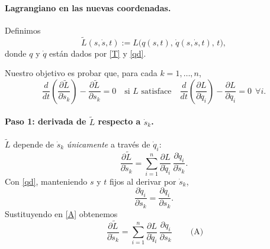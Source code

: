 \paragraph{Lagrangiano en las nuevas coordenadas.}
Definimos
\begin{equation}
\label{Ltilde}
\tilde L(s,\dot s,t):=L\!\big(q(s,t),\,\dot q(s,\dot s,t),\,t\big),
\end{equation}
donde $q$ y $\dot q$ están dados por \eqref{T} y \eqref{qd}.

Nuestro objetivo es probar que, para cada $k=1,\ldots,n$,
\[
\frac{d}{dt}\!\left(\frac{\partial \tilde L}{\partial \dot s_k}\right)
-\frac{\partial \tilde L}{\partial s_k}=0
\quad \text{si $L$ satisface}\quad
\frac{d}{dt}\!\left(\frac{\partial L}{\partial \dot q_i}\right)-\frac{\partial L}{\partial q_i}=0\ \ \forall i.
\]

\paragraph{Paso 1: derivada de $\tilde L$ respecto a $\dot s_k$.}
$\tilde L$ depende de $\dot s_k$ \emph{únicamente} a través de $\dot q_i$:
\begin{equation}
\label{A}
\frac{\partial \tilde L}{\partial \dot s_k}
=\sum_{i=1}^n \frac{\partial L}{\partial \dot q_i}\,
\frac{\partial \dot q_i}{\partial \dot s_k}.
\end{equation}
Con \eqref{qd}, manteniendo $s$ y $t$ fijos al derivar por $\dot s_k$,
\[
\frac{\partial \dot q_i}{\partial \dot s_k}
=\frac{\partial q_i}{\partial s_k}.
\]
Sustituyendo en \eqref{A} obtenemos
\begin{equation}
\label{Aboxed}
\boxed{\ \frac{\partial \tilde L}{\partial \dot s_k}
=\sum_{i=1}^n \frac{\partial L}{\partial \dot q_i}\,
\frac{\partial q_i}{\partial s_k}\ } \qquad\text{(A)}
\end{equation}

